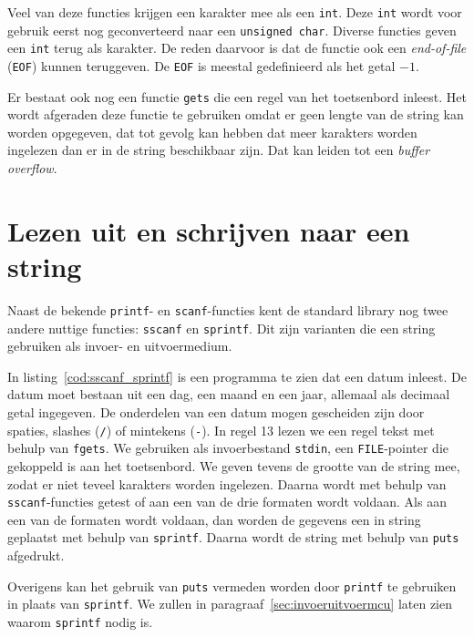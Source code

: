 Veel van deze functies krijgen een karakter mee als een \texttt{int}. Deze \texttt{int} wordt voor gebruik eerst nog geconverteerd naar een \texttt{unsigned char}. Diverse functies geven een \texttt{int} terug als karakter. De reden daarvoor is dat de functie ook een \textsl{end-of-file} (\texttt{EOF}) kunnen teruggeven. De \texttt{EOF} is meestal gedefinieerd als het getal $-1$.

Er bestaat ook nog een functie \texttt{gets} die een regel van het toetsenbord inleest. Het wordt afgeraden deze functie te gebruiken omdat er geen lengte van de string kan worden opgegeven, dat tot gevolg kan hebben dat meer karakters worden ingelezen dan er in de string beschikbaar zijn. Dat kan leiden tot een \textsl{buffer overflow}.


\section{Lezen uit en schrijven naar een string}
\label{sec:lezenschrijvenstring}
Naast de bekende \texttt{printf}- en \texttt{scanf}-functies kent de standard library nog twee andere nuttige functies: \texttt{sscanf} en \texttt{sprintf}. Dit zijn varianten die een string gebruiken als invoer- en uitvoermedium.

In listing~\ref{cod:sscanf_sprintf} is een programma te zien dat een datum inleest. De datum moet bestaan uit een dag, een maand en een jaar, allemaal als decimaal getal ingegeven. De onderdelen van een datum mogen gescheiden zijn door spaties, slashes (\texttt{/}) of mintekens (\texttt{-}). In regel 13 lezen we een regel tekst met behulp van \texttt{fgets}. We gebruiken als invoerbestand \texttt{stdin}, een \texttt{FILE}-pointer die gekoppeld is aan het toetsenbord. We geven tevens de grootte van de string mee, zodat er niet teveel karakters worden ingelezen. Daarna wordt met behulp van \texttt{sscanf}-functies getest of aan een van de drie formaten wordt voldaan. Als aan een van de formaten wordt voldaan, dan worden de gegevens een in string geplaatst met behulp van \texttt{sprintf}. Daarna wordt de string met behulp van \texttt{puts} afgedrukt.


Overigens kan het gebruik van \texttt{puts} vermeden worden door \texttt{printf} te gebruiken in plaats van \texttt{sprintf}. \ifuseadvanced We zullen in paragraaf~\ref{sec:invoeruitvoermcu} laten zien waarom \texttt{sprintf} nodig is.\fi


